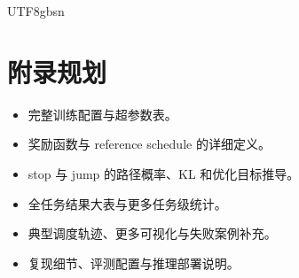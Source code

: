 \documentclass{article}
\begin{document}
\begin{CJK*}{UTF8}{gbsn}


\appendix

\section{附录规划}

\begin{itemize}
  \item 完整训练配置与超参数表。
  \item 奖励函数与 reference schedule 的详细定义。
  \item stop 与 jump 的路径概率、KL 和优化目标推导。
  \item 全任务结果大表与更多任务级统计。
  \item 典型调度轨迹、更多可视化与失败案例补充。
  \item 复现细节、评测配置与推理部署说明。
\end{itemize}

\end{CJK*}
\end{document}
